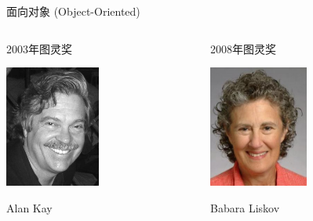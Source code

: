 \begin{frame}{面向对象 (Object-Oriented)}
  \begin{columns}
    \begin{column}{.33\textwidth}
      \begin{block}{2003年图灵奖}
        \begin{center}
          \includegraphics[height=4cm]{kay.jpg}

          Alan Kay
        \end{center}
      \end{block}
    \end{column}
    \begin{column}{.33\textwidth}
      \begin{block}{2008年图灵奖}
        \begin{center}
          \includegraphics[height=4cm]{liskov.jpg}

          Babara Liskov
        \end{center}
      \end{block}
    \end{column}
  \end{columns}
\end{frame}

